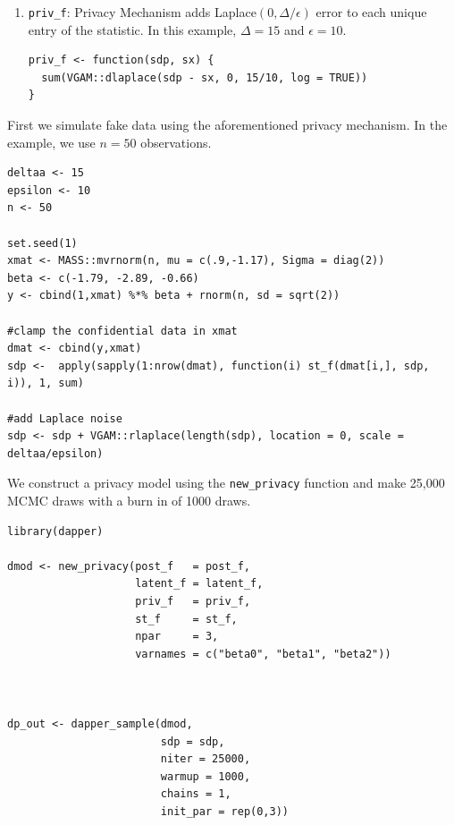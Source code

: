\begin{enumerate}
\begin{verbatim}
  s1 <- t(xdp) %*% ydp
  s2 <- t(ydp) %*% ydp
  s3 <- t(xdp) %*% xdp

  ur_s1 <- c(s1)
  ur_s2 <- c(s2)
  ur_s3 <- s3[upper.tri(s3,diag = TRUE)][-1]
  c(ur_s1,ur_s2,ur_s3)
}
\end{verbatim}
\item
  \texttt{priv\_f}: Privacy Mechanism
  adds Laplace\((0, \Delta/\epsilon)\) error to each unique entry
  of the statistic. In this example, \(\Delta = 15\) and \(\epsilon = 10\).

\begin{verbatim}
priv_f <- function(sdp, sx) {
  sum(VGAM::dlaplace(sdp - sx, 0, 15/10, log = TRUE))
}
\end{verbatim}
\end{enumerate}

First we simulate fake data using the aforementioned privacy mechanism.
In the example, we use \(n = 50\) observations.

\begin{verbatim}
deltaa <- 15
epsilon <- 10
n <- 50

set.seed(1)
xmat <- MASS::mvrnorm(n, mu = c(.9,-1.17), Sigma = diag(2))
beta <- c(-1.79, -2.89, -0.66)
y <- cbind(1,xmat) %*% beta + rnorm(n, sd = sqrt(2))

#clamp the confidential data in xmat
dmat <- cbind(y,xmat)
sdp <-  apply(sapply(1:nrow(dmat), function(i) st_f(dmat[i,], sdp, i)), 1, sum)

#add Laplace noise 
sdp <- sdp + VGAM::rlaplace(length(sdp), location = 0, scale = deltaa/epsilon)
\end{verbatim}

We construct a privacy model using the \texttt{new\_privacy} function and
make 25,000 MCMC draws with a burn in of 1000 draws.

\begin{verbatim}
library(dapper)

dmod <- new_privacy(post_f   = post_f,
                    latent_f = latent_f,
                    priv_f   = priv_f,
                    st_f     = st_f,
                    npar     = 3,
                    varnames = c("beta0", "beta1", "beta2"))



dp_out <- dapper_sample(dmod,
                        sdp = sdp,
                        niter = 25000,
                        warmup = 1000,
                        chains = 1,
                        init_par = rep(0,3))
\end{verbatim}

